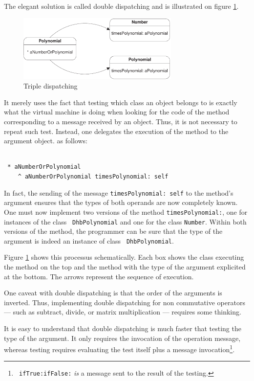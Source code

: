 \documentclass[twoside]{book}
\begin{document}
The elegant solution is called double dispatching and is
illustrated on figure \ref{fig:doubledispatch}.
\begin{figure}
\centering\includegraphics[width=8cm]{Figures/DoubleDispatching}
\caption{Triple dispatching}\label{fig:doubledispatch}
\end{figure}
It merely uses the fact that testing which class an object belongs
to is exactly what the virtual machine is doing when looking for
the code of the method corresponding to a message received by an
object. Thus, it is not necessary to repeat such test. Instead,
one delegates the execution of the method to the argument object.
as follows:
\begin{codeExample}
\begin{verbatim}

 * aNumberOrPolynomial
    ^ aNumberOrPolynomial timesPolynomial: self
\end{verbatim}
\end{codeExample}
In fact, the sending of the message {\tt timesPolynomial: self} to
the method's argument ensures that the types of both operands are
now completely known. One must now implement two versions of the
method {\tt timesPolynomial:}, one for instances of the class {\tt
DhbPolynomial} and one for the class {\tt Number}. Within both
versions of the method, the programmer can be sure that the type
of the argument is indeed an instance of class {\tt
DhbPolynomial}.

Figure \ref{fig:doubledispatch} shows this processus
schematically. Each box shows the class executing the method on
the top and the method with the type of the argument explicited at
the bottom. The arrows represent the sequence of execution.

One caveat with double dispatching is that the order of the
arguments is inverted. Thus, implementing double dispatching for
non commutative operators --- such as subtract, divide, or matrix
multiplication --- requires some thinking.

It is easy to understand that double dispatching is much faster
that testing the type of the argument. It only requires the
invocation of the operation message, whereas testing requires
evaluating the test itself plus a message invocation\footnote{{\tt
ifTrue:ifFalse:} {\it is} a message sent to the result of the
testing.}.
\end{document}
